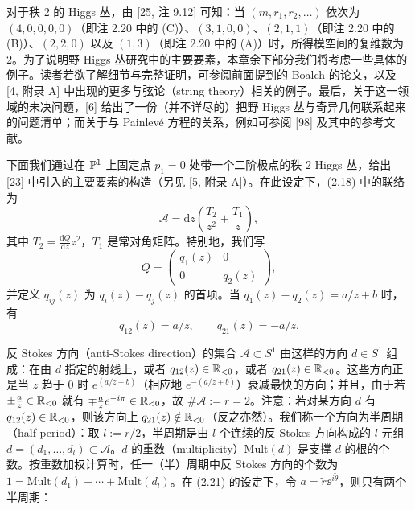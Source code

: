 

对于秩 2 的 Higgs 丛，由 [25, 注 9.12] 可知：当 $(m,r_1,r_2,\dots)$ 依次为 $(4,0,0,0,0)$（即注 2.20 中的 (C)）、$(3,1,0,0)$、$(2,1,1)$（即注 2.20 中的 (B)）、$(2,2,0)$ 以及 $(1,3)$（即注 2.20 中的 (A)）时，所得模空间的复维数为 2。为了说明野 Higgs 丛研究中的主要要素，本章余下部分我们将考虑一些具体的例子。读者若欲了解细节与完整证明，可参阅前面提到的 Boalch 的论文，以及 [4, 附录 A] 中出现的更多与弦论（string theory）相关的例子。最后，关于这一领域的未决问题，[6] 给出了一份（并不详尽的）把野 Higgs 丛与奇异几何联系起来的问题清单；而关于与 Painlevé 方程的关系，例如可参阅 [98] 及其中的参考文献。


下面我们通过在 $\mathbb{P}^{1}$ 上固定点 $p_1=0$ 处带一个二阶极点的秩 2 Higgs 丛，给出 [23] 中引入的主要要素的构造（另见 [5, 附录 A]）。在此设定下，(2.18) 中的联络为
\begin{equation}
\mathcal{A}=\mathrm{d}z\left(\frac{T_2}{z^{2}}+\frac{T_1}{z}\right), \tag{2.21}
\end{equation}
其中 $T_2=\frac{\mathrm{d}Q}{\mathrm{d}z}z^{2}$，$T_1$ 是常对角矩阵。特别地，我们写
\[
Q=\begin{pmatrix}q_1(z)&0\\ 0&q_2(z)\end{pmatrix},
\]
并定义 $q_{ij}(z)$ 为 $q_i(z)-q_j(z)$ 的首项。当 $q_1(z)-q_2(z)=a/z+b$ 时，有
\[
q_{12}(z)=a/z,\qquad q_{21}(z)=-a/z.
\]


反 Stokes 方向（anti-Stokes direction）的集合 $\mathcal{A}\subset S^{1}$ 由这样的方向 $d\in S^{1}$ 组成：在由 $d$ 指定的射线上，或者 $q_{12}(z)\in\mathbb{R}_{<0}$，或者 $q_{21}(z)\in\mathbb{R}_{<0}$。这些方向正是当 $z$ 趋于 $0$ 时 $e^{(a/z+b)}$（相应地 $e^{-(a/z+b)}$）衰减最快的方向；并且，由于若 $\pm\frac{a}{z}\in\mathbb{R}_{<0}$ 就有 $\mp\frac{a}{z}e^{-i\pi}\in\mathbb{R}_{<0}$，故 $\#\mathcal{A}:=r=2$。注意：若对某方向 $d$ 有 $q_{12}(z)\in\mathbb{R}_{<0}$，则该方向上 $q_{21}(z)\notin\mathbb{R}_{<0}$（反之亦然）。我们称一个方向为半周期（half-period）：取 $l:=r/2$，半周期是由 $l$ 个连续的反 Stokes 方向构成的 $l$ 元组 $d=(d_1,\dots,d_l)\subset\mathcal{A}$。$d$ 的重数（multiplicity）$\mathrm{Mult}(d)$ 是支撑 $d$ 的根的个数。按重数加权计算时，任一（半）周期中反 Stokes 方向的个数为 $1=\mathrm{Mult}(d_1)+\cdots+\mathrm{Mult}(d_l)$。在 (2.21) 的设定下，令 $a=\tilde{r}\ee^{i\tilde{\theta}}$，则只有两个半周期：

